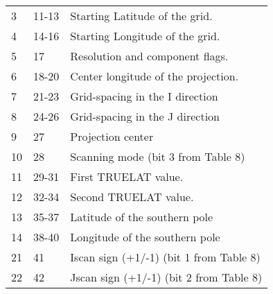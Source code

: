 \begin{longtable}{l|l|l}
      3 &      11-13  &  Starting Latitude of the grid.\\                            
      4 &      14-16  &  Starting Longitude of the grid. \\                          
      5 &           17  &  Resolution and component flags. \\                   
      6 &      18-20  &  Center longitude of the projection. \\                      
      7 &      21-23  &  Grid-spacing in the I direction   \\                        
      8 &      24-26  &  Grid-spacing in the J direction  \\                         
      9 &           27  &  Projection center         \\                                
     10 &          28  &  Scanning mode (bit 3 from Table 8) \\                       
     11 &     29-31  &  First TRUELAT value.     \\                                 
     12 &     32-34  &  Second TRUELAT value.      \\                               
     13 &     35-37  &  Latitude of the southern pole \\                          
     14 &     38-40  &  Longitude of the southern pole \\                        
     21 &          41  &  Iscan sign (+1/-1) (bit 1 from Table 8) \\                 
     22 &          42  &  Jscan sign (+1/-1) (bit 2 from Table 8) \\              


\end{longtable}
